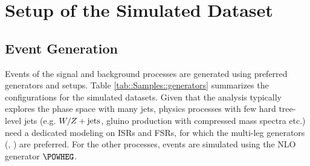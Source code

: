 

\section{Setup of the Simulated Dataset}
\subsection{Event Generation} \label{sec:Samples::generators}
Events of the signal and background processes are generated using preferred generators and setups. 
Table \ref{tab::Samples::generators} summarizes the configurations for the simulated datasets.
Given that the analysis typically explores the phase space with many jets, 
physics processes with few hard tree-level jets (e.g. $W/Z+\mathrm{jets}$, gluino production with compressed mass spectra etc.) need a dedicated modeling on ISRs and FSRs, 
for which the multi-leg generators (\sherpa, \madgraph) are preferred. 
For the other processes, events are simulated using the NLO generator $\powheg$. \\

